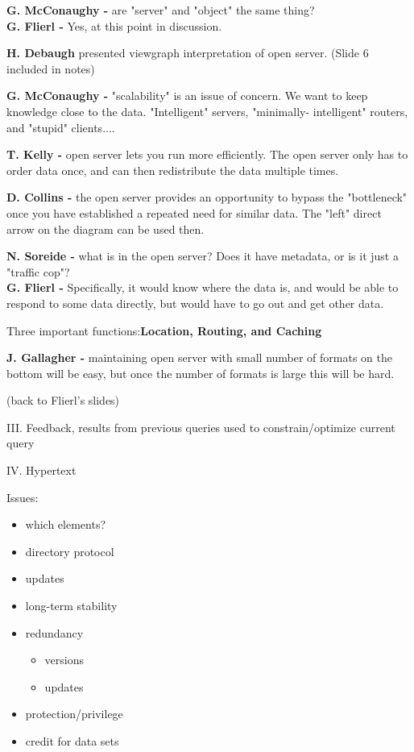 \medskip
{\bf G. McConaughy -} are "server" and "object" the same thing?\\
{\bf G. Flierl -} Yes,  at this point in discussion.

\medskip
{\bf H. Debaugh} presented viewgraph interpretation of open server. (Slide 6 
included in notes)

\medskip
{\bf G. McConaughy -} "scalability" is an issue of concern.  We want to keep 
knowledge close to the data.  "Intelligent" servers,  "minimally-
intelligent" routers, and "stupid" clients....

\medskip
{\bf T. Kelly -} open server lets you run more efficiently.  The open server only 
has to order data once, and can then redistribute the data multiple times.

\medskip
{\bf D. Collins -} the open server provides an opportunity to bypass the 
"bottleneck" once you have established a repeated need for similar data.  
The "left" direct arrow on the diagram can be used then.

\medskip
{\bf N. Soreide -} what is in the open server? Does it have metadata, or is it 
just a "traffic cop"?\\
{\bf G. Flierl -} Specifically, it would know where the 
data is, and would be able to respond to some data directly, but would 
have to go out and get other data.

\medskip
Three important functions:{\bf  Location, Routing, and Caching}

\medskip
{\bf J. Gallagher -} maintaining open server with small number of formats on 
the bottom will be easy, but once the number of formats is large this will 
be hard.

\medskip
(back to Flierl's slides)
\begin{description}
     \begin{description}
	\item{III.} Feedback, results from previous queries used to
constrain/optimize current query 
	\item{IV.} Hypertext
      \end{description}

\item{} Issues:
     \begin{itemize}
	\item which elements?
	\item directory protocol
	\item updates
	\item long-term stability 
	\item redundancy
	     \begin{itemize}
		\item versions
		\item updates
	     \end{itemize}
	\item protection/privilege
	\item credit for data sets
     \end{itemize}
\end{description}

